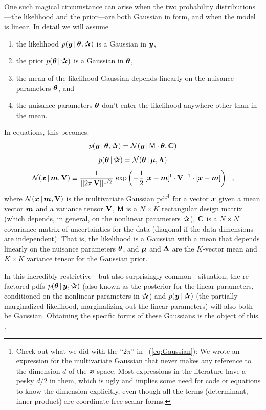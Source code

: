 One such magical circumstance can arise when the two probability
distributions---the likelihood and the prior---are both Gaussian in
form, and when the model is linear.
In detail we will assume
\begin{enumerate}
\item
the likelihood $p(\vy\given\vtheta,\bP)$ is a Gaussian in $\boldsymbol{y}$,
\item
the prior $p(\vtheta\given\bP)$ is a Gaussian in $\boldsymbol{\theta}$,
\item
the mean of the likelihood Gaussian depends linearly on the nuisance
parameters $\boldsymbol{\theta}$, and
\item
the nuisance parameters $\boldsymbol{\theta}$ don't enter the likelihood anywhere
other than in the mean.
\end{enumerate}
In equations, this becomes:
\begin{equation}
p(\vy\given\vtheta,\bP) = \normal(\vy\given\mM\cdot\vtheta,\tC)
\end{equation}
\begin{equation}
p(\vtheta\given\bP) = \normal(\vtheta\given\vmu,\tLambda)
\end{equation}
\begin{equation}\label{eq:Gaussian}
\mathcal{N}\!\,(\boldsymbol{x}\,|\,\boldsymbol{m},\mathbf{V}) \equiv \frac{1}{||2\pi\,\mathbf{V}||^{1/2}}\,\exp\left(-\frac{1}{2}\,[\boldsymbol{x}-\boldsymbol{m}]^{\!\mathsf{T}\!} \cdot \mathbf{V}^{-1} \cdot [\boldsymbol{x} - \boldsymbol{m}]\right)
~~,
\end{equation}
where $\mathcal{N}\!\,(\boldsymbol{x}\,|\,\boldsymbol{m},\mathbf{V})$ is the multivariate Gaussian
pdf\footnote{Check out what we did with the ``$2\pi$'' in
  \equationname~(\ref{eq:Gaussian}): We wrote an expression for the
  multivariate Gaussian that never makes any reference to the
  dimension $d$ of the $\boldsymbol{x}$-space. Most expressions in the literature
  have a pesky $d/2$ in them, which is ugly and implies some need for
  code or equations to know the dimension explicitly, even though all
  the terms (determinant, inner product) are coordinate-free scalar
  forms.} for a vector $\boldsymbol{x}$
given a mean vector $\boldsymbol{m}$ and a variance tensor $\mathbf{V}$,
$\mathsf{M}$ is a $N\times K$ rectangular design matrix (which depends, in
general, on the nonlinear parameters $\bP$),
$\mathbf{C}$ is a $N\times N$ covariance matrix of uncertainties for the
data (diagonal if the data dimensions are independent).
That is, the likelihood is a Gaussian with a mean that depends
linearly on the nuisance parameters $\boldsymbol{\theta}$, and
$\boldsymbol{\mu}$ and $\mathbf{\Lambda}$ are the $K$-vector mean and $K\times K$ variance tensor
for the Gaussian prior.

In this incredibly restrictive---but also surprisingly
common---situation, the re-factored pdfs $p(\vtheta\given\vy,\bP)$
(also known as the posterior for the linear parameters, conditioned on
the nonlinear parameters in $\bP$) and $p(\vy\given\bP)$ (the
partially marginalized likelihood, marginalizing out the linear
parameters) will also both be Gaussian.
Obtaining the specific forms of these Gaussians is the object of this
\documentname.

